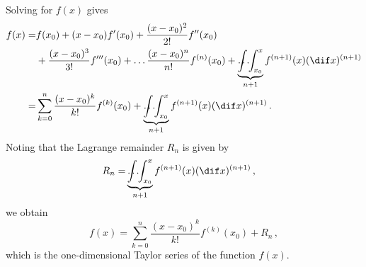 Solving for $f(x)$ gives
\begin{align*}
  f(x) = &f(x_0)
           + (x - x_0) f'(x_0)
           + \frac{(x-x_0)^2}{2!} f''(x_0) \\
         &+ \frac{(x - x_0)^3}{3!} f'''(x_0)
           + \mathellipsis \frac{(x - x_0)^n}{n!} f^{(n)}(x_0)
           + \underbrace{\int \hspace{-4mm} \hdots \hspace{-1mm} \int_{x_0}^x}_{n+1}{f^{(n+1)}(x)(\dif x)^{(n+1)}} \\
  = &\sum_{k=0}^n{\frac{(x - x_0)^k}{k!}}f^{(k)}(x_0) + \underbrace{\int \hspace{-4mm} \hdots \hspace{-1mm} \int_{x_0}^x}_{n+1}{f^{(n+1)}(x)(\dif x)^{(n+1)}} \, .
\end{align*}
Noting that the Lagrange remainder $R_n$ is given by
\begin{align*}
  R_n = &\underbrace{\int \hspace{-4mm} \hdots \hspace{-1mm} \int_{x_0}^x}_{n+1}{f^{(n+1)}(x)(\dif x)^{(n+1)}} \, ,
\end{align*}
we obtain
\begin{equation}
  \label{eq:tayse}
  f(x) = \sum_{k=0}^n{\frac{(x - x_0)^k}{k!}}f^{(k)}(x_0) + R_n \, ,
\end{equation}
which is the one-dimensional Taylor series of the function $f(x)$.

